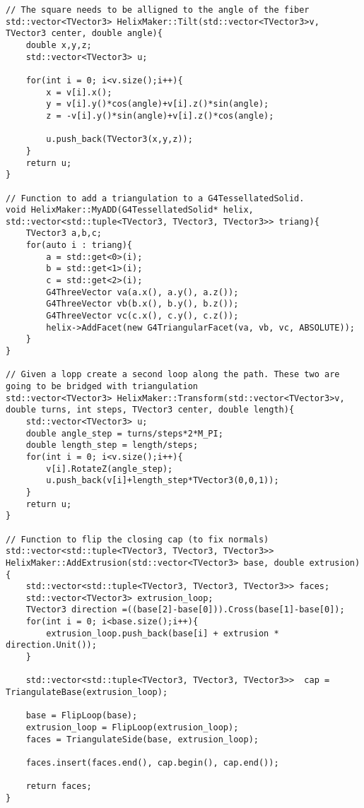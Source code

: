 \begin{lstlisting}
// The square needs to be alligned to the angle of the fiber
std::vector<TVector3> HelixMaker::Tilt(std::vector<TVector3>v,  TVector3 center, double angle){
    double x,y,z;
    std::vector<TVector3> u;

    for(int i = 0; i<v.size();i++){
        x = v[i].x();
        y = v[i].y()*cos(angle)+v[i].z()*sin(angle);
        z = -v[i].y()*sin(angle)+v[i].z()*cos(angle);
             
        u.push_back(TVector3(x,y,z));
    }
    return u;
}

// Function to add a triangulation to a G4TessellatedSolid.
void HelixMaker::MyADD(G4TessellatedSolid* helix, std::vector<std::tuple<TVector3, TVector3, TVector3>> triang){
	TVector3 a,b,c;
	for(auto i : triang){
		a = std::get<0>(i);
		b = std::get<1>(i);
		c = std::get<2>(i);
		G4ThreeVector va(a.x(), a.y(), a.z());
        G4ThreeVector vb(b.x(), b.y(), b.z());
        G4ThreeVector vc(c.x(), c.y(), c.z());
        helix->AddFacet(new G4TriangularFacet(va, vb, vc, ABSOLUTE));
	}
}

// Given a lopp create a second loop along the path. These two are going to be bridged with triangulation
std::vector<TVector3> HelixMaker::Transform(std::vector<TVector3>v, double turns, int steps, TVector3 center, double length){
    std::vector<TVector3> u;
    double angle_step = turns/steps*2*M_PI;
    double length_step = length/steps;
    for(int i = 0; i<v.size();i++){
        v[i].RotateZ(angle_step);
        u.push_back(v[i]+length_step*TVector3(0,0,1));
    }
    return u;
}

// Function to flip the closing cap (to fix normals)
std::vector<std::tuple<TVector3, TVector3, TVector3>> HelixMaker::AddExtrusion(std::vector<TVector3> base, double extrusion){
    std::vector<std::tuple<TVector3, TVector3, TVector3>> faces;
    std::vector<TVector3> extrusion_loop;
    TVector3 direction =((base[2]-base[0])).Cross(base[1]-base[0]);
    for(int i = 0; i<base.size();i++){
        extrusion_loop.push_back(base[i] + extrusion * direction.Unit());
    }

    std::vector<std::tuple<TVector3, TVector3, TVector3>>  cap = TriangulateBase(extrusion_loop);

    base = FlipLoop(base);
    extrusion_loop = FlipLoop(extrusion_loop);
    faces = TriangulateSide(base, extrusion_loop);

    faces.insert(faces.end(), cap.begin(), cap.end());

    return faces;
}

\end{lstlisting}